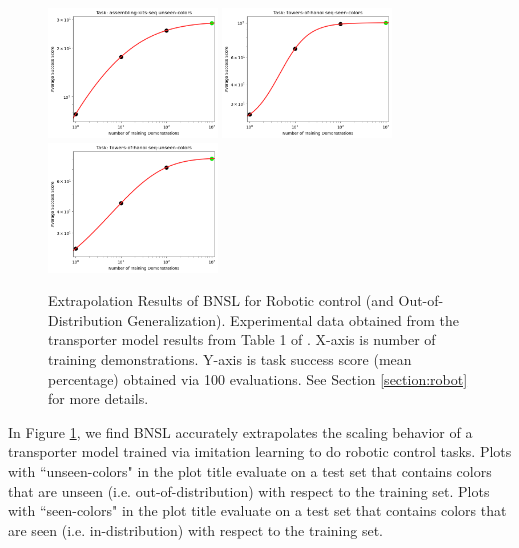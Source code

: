 \documentclass{article} %
\begin{document}
\begin{figure}[htbp]
    \centering
\includegraphics[width=0.4\textwidth]{figures/robot/assembling-kits-seq_unseen-colors.png}
\includegraphics[width=0.4\textwidth]{figures/robot/towers-of-hanoi_seq-seen-colors.png}
\includegraphics[width=0.4\textwidth]{figures/robot/towers-of-hanoi_seq-unseen-colors.png}
    \caption{
Extrapolation Results of BNSL for Robotic control (and Out-of-Distribution Generalization). Experimental data obtained from the transporter \citep{zeng2021transporter} model results from Table 1 of \cite{shridhar2021cliport}. X-axis is number of training demonstrations. Y-axis is task success score (mean percentage) obtained via 100 evaluations. See Section \ref{section:robot} for more details.
    }
    \label{fig:robot}
\end{figure}

In Figure \ref{fig:robot}, we find BNSL accurately extrapolates the scaling behavior of a transporter \citep{zeng2021transporter} model trained via imitation learning to do robotic control tasks. Plots with ``unseen-colors" in the plot title evaluate on a test set that contains colors that are unseen (i.e. out-of-distribution) with respect to the training set. Plots with ``seen-colors" in the plot title evaluate on a test set that contains colors that are seen (i.e. in-distribution) with respect to the training set.
\end{document}
